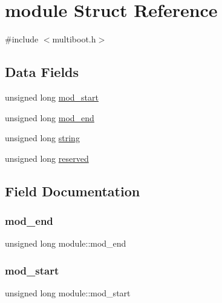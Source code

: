 \hypertarget{structmodule}{}\section{module Struct Reference}
\label{structmodule}


{\ttfamily \#include $<$multiboot.\+h$>$}

\subsection*{Data Fields}
\begin{DoxyCompactItemize}
\item 
unsigned long \hyperlink{structmodule_a84687b45c01d23d7d150b03cebd72b55}{mod\+\_\+start}
\item 
unsigned long \hyperlink{structmodule_a376743954457daffed59dfc901a0c2ad}{mod\+\_\+end}
\item 
unsigned long \hyperlink{structmodule_a8a633c3be731cb6cdf8c5573bec1f0e8}{string}
\item 
unsigned long \hyperlink{structmodule_ab5de2b041a77d60294192208acc2d8a0}{reserved}
\end{DoxyCompactItemize}


\subsection{Field Documentation}
\mbox{\label{structmodule_a376743954457daffed59dfc901a0c2ad}} 
\subsubsection{\texorpdfstring{mod\+\_\+end}{mod\_end}}
{\footnotesize\ttfamily unsigned long module\+::mod\+\_\+end}

\mbox{\label{structmodule_a84687b45c01d23d7d150b03cebd72b55}} 
\subsubsection{\texorpdfstring{mod\+\_\+start}{mod\_start}}
{\footnotesize\ttfamily unsigned long module\+::mod\+\_\+start}

\mbox{\label{structmodule_ab5de2b041a77d60294192208acc2d8a0}} 
